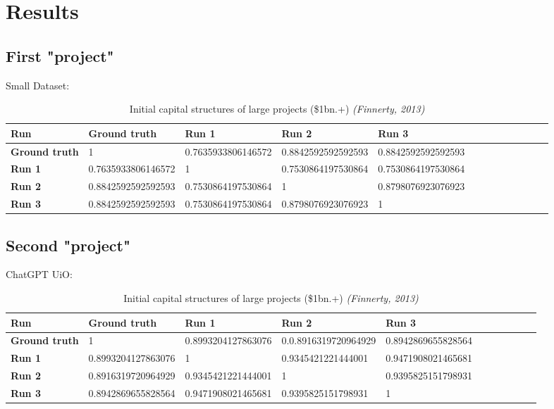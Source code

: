 \section*{Results}
\subsection*{First "project"}
Small Dataset:
\begin{table}[h]
    \centering
        \begin{tabular}{@{}lllllllllllll@{}}\toprule        %
            \textbf{Run}  & \textbf{Ground truth} & \textbf{Run 1} & \textbf{Run 2} & \textbf{Run 3}\\ 
            \midrule
            \textbf{Ground truth} & 1  & 0.7635933806146572 & 0.8842592592592593 & 0.8842592592592593\\
            \hdashline
            \textbf{Run 1} & 0.7635933806146572 & 1 & 0.7530864197530864 & 0.7530864197530864\\
            \hdashline
            \textbf{Run 2} & 0.8842592592592593 & 0.7530864197530864 & 1 & 0.8798076923076923\\
            \hdashline
            \textbf{Run 3} & 0.8842592592592593 & 0.7530864197530864 & 0.8798076923076923 & 1\\
            \bottomrule
        \end{tabular}
    \caption{Initial capital structures of large projects (\$1bn.+) \emph{(Finnerty, 2013)}}
\end{table}

\subsection*{Second "project"}

ChatGPT UiO:
\begin{table}[h]            %
    \centering
    \begin{tabular}{@{}lllllllllll@{}}\toprule
        \textbf{Run}  & \textbf{Ground truth} & \textbf{Run 1} & \textbf{Run 2} & \textbf{Run 3}\\ 
        \midrule
        \textbf{Ground truth} & \cellcolor[HTML]{FFFFFF} 1  & 0.8993204127863076 & 0.0.8916319720964929 & 0.8942869655828564\\
        \hdashline
        \textbf{Run 1} & 0.8993204127863076 & 1 & 0.9345421221444001 & 0.9471908021465681\\
        \hdashline
        \textbf{Run 2} & 0.8916319720964929 & 0.9345421221444001 & 1 & 0.9395825151798931\\
        \hdashline
        \textbf{Run 3} & 0.8942869655828564 & 0.9471908021465681 & 0.9395825151798931 & 1\\
        \bottomrule
    \end{tabular}
    \caption{Initial capital structures of large projects (\$1bn.+) \emph{(Finnerty, 2013)}}
\end{table}

